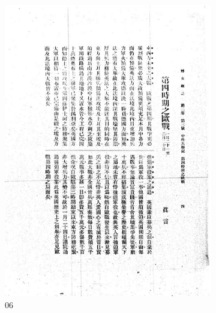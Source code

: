 \documentclass[12pt,twoside]{report}
\begin{document}
\begin{appendices}
\begin{figure}[htbp]
\begin{subfigure}[b]{0.23\linewidth}
        \includegraphics[width=\linewidth]{./figures/testset/06.jpg}
        \caption{06}
        \label{fig:test_06}
    \end{subfigure}
    \hfill
    \begin{subfigure}[b]{0.23\linewidth}

\end{subfigure}
\end{figure}
\end{appendices}
\end{document}
